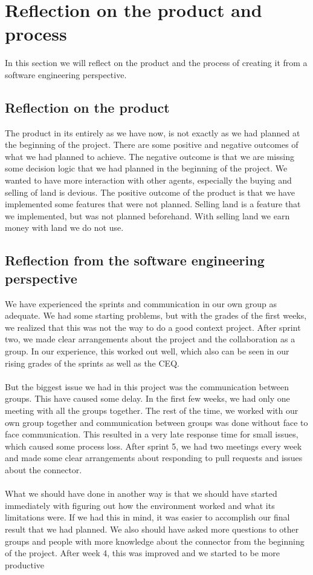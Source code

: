 \chapter{Reflection on the product and process}
In this section we will reflect on the product and the process of creating it from a software engineering perspective.

\section{Reflection on the product}
The product in its entirely as we have now, is not exactly as we had planned at the beginning of the project. There are some positive and negative outcomes of what we had planned to achieve. The negative outcome is that we are missing some decision logic that we had planned in the beginning of the project. We wanted to have more interaction with other agents, especially the buying and selling of land is devious. 
The positive outcome of the product is that we have implemented some features that were not planned. Selling land is a feature that we implemented, but was not planned beforehand. With selling land we earn money with land we do not use.

\section{Reflection from the software engineering perspective}
We have experienced the sprints and communication in our own group as adequate. We had some starting problems, but with the grades of the first weeks, we realized that this was not the way to do a good context project. After sprint two, we made clear arrangements about the project and the collaboration as a group. In our experience, this worked out well, which also can be seen in our rising grades of the sprints as well as the CEQ.
\\\\
But the biggest issue we had in this project was the communication between groups. This have caused some delay. In the first few weeks, we had only one meeting with all the groups together. The rest of the time, we worked with our own group together and communication between groups was done without face to face communication. This resulted in a very late response time for small issues, which caused some process loss. After sprint 5, we had two meetings every week and made some clear arrangements about responding to pull requests and issues about the connector.
\\\\
What we should have done in another way is that we should have started immediately with figuring out how the environment worked and what its limitations were. If we had this in mind, it was easier to accomplish our final result that we had planned. We also should have asked more questions to other groups and people with more knowledge about the connector from the beginning of the project. After week 4, this was improved and we started to be more productive



